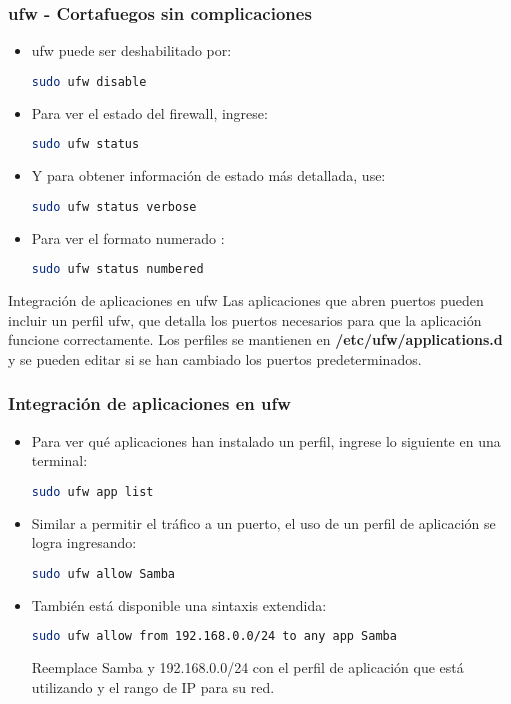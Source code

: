 \begin{frame}[fragile]
  \frametitle{ufw - Cortafuegos sin complicaciones}
  \begin{itemize}
    \item ufw puede ser deshabilitado por:
      \begin{lstlisting}[language=Bash,numbers=none]
sudo ufw disable
      \end{lstlisting}
    \item Para ver el estado del firewall, ingrese:
      \begin{lstlisting}[language=Bash,numbers=none]
sudo ufw status
      \end{lstlisting}
    \item Y para obtener información de estado más detallada, use:
      \begin{lstlisting}[language=Bash,numbers=none]
sudo ufw status verbose
      \end{lstlisting}
    \item Para ver el formato numerado :
      \begin{lstlisting}[language=Bash,numbers=none]
sudo ufw status numbered
      \end{lstlisting}
  \end{itemize}
\end{frame}

\begin{frame}[c]{Integración de aplicaciones en ufw}
  Las aplicaciones que abren puertos pueden incluir un perfil ufw,
  que detalla los puertos necesarios para que la aplicación funcione
  correctamente. Los perfiles se mantienen en
  \textbf{/etc/ufw/applications.d} y
  se pueden editar si se han cambiado los puertos predeterminados.
\end{frame}

\begin{frame}[fragile]
  \frametitle{Integración de aplicaciones en ufw}
  \begin{itemize}
    \item Para ver qué aplicaciones han instalado un perfil,
      ingrese lo siguiente en una terminal:
      \begin{lstlisting}[language=Bash,numbers=none]
sudo ufw app list
      \end{lstlisting}
    \item Similar a permitir el tráfico a un puerto, el uso de un
      perfil de aplicación se logra ingresando:
      \begin{lstlisting}[language=Bash,numbers=none]
sudo ufw allow Samba
      \end{lstlisting}
    \item También está disponible una sintaxis extendida:
      \begin{lstlisting}[language=Bash,numbers=none]
sudo ufw allow from 192.168.0.0/24 to any app Samba
      \end{lstlisting}
      Reemplace Samba y 192.168.0.0/24 con el perfil de aplicación que
      está utilizando y el rango de IP para su red.
  \end{itemize}
\end{frame}

